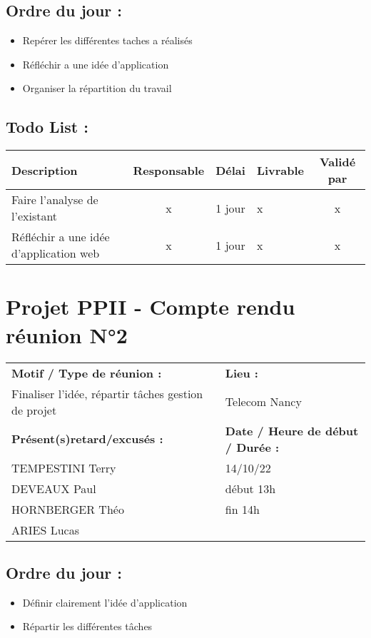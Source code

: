 \documentclass[12pt,titlepage]{report}
\begin{document}
\subsection*{Ordre du jour :}
\begin{itemize}
    \item{Repérer les différentes taches a réalisés}
    \item{Réfléchir a une idée d’application}
    \item{Organiser la répartition du travail}
\end{itemize}

\subsection*{Todo List :}
\begin{tabular}{|p{3.5cm}|c|c|p{4.5cm}|c|}
    \hline 
    Description & Responsable & Délai & Livrable & Validé par 
    \\ \hline
    Faire l’analyse de l’existant & x & 1 jour & x & x
    \\ \hline
    Réfléchir a une idée d’application web & x & 1 jour & x & x
    \\ \hline
\end{tabular}
\newpage

\section*{Projet PPII - Compte rendu réunion N°2}
\begin{tabular}{|p{7cm}|p{6cm}|}
    \hline
    \textbf{Motif / Type de réunion :}
    & \textbf{Lieu :}
    \\
    Finaliser l’idée, répartir tâches gestion de projet 
    & 
    Telecom Nancy
    \\ \hline
    \textbf{Présent(s)retard/excusés :}
    &
    \textbf{Date / Heure de début / Durée :}
    \\ 
    TEMPESTINI Terry &  14/10/22\\  
    DEVEAUX Paul & début 13h\\
    HORNBERGER Théo & fin 14h\\
    ARIES Lucas & 
    \\ \hline
\end{tabular}

\subsection*{Ordre du jour :}
\begin{itemize}
    \item{Définir clairement l’idée d’application}
    \item{Répartir les différentes tâches}
\end{itemize}
\end{document}
